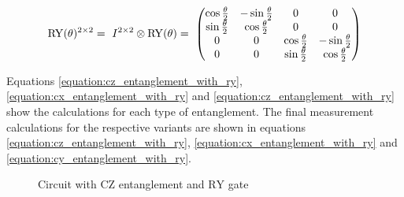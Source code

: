  \begin{equation}
     \centering
     \begin{split}
        \mathrm{RY}(\theta)^{2\times2} =\ I^{2\times2}\otimes\mathrm{RY}(\theta) =\  \begin{pmatrix}
        \cos{\frac{\theta}{2}} & -\sin{\frac{\theta}{2}} & 0 & 0\\
        \sin{\frac{\theta}{2}} & \cos{\frac{\theta}{2}} & 0 & 0 \\
        0 & 0 & \cos{\frac{\theta}{2}} & -\sin{\frac{\theta}{2}}\\
        0 & 0 & \sin{\frac{\theta}{2}} & \cos{\frac{\theta}{2}}\\
    \end{pmatrix}\\
     \end{split}
     \label{equation:2_x_2_ry}
 \end{equation}

Equations \ref{equation:cz_entanglement_with_ry}, \ref{equation:cx_entanglement_with_ry} and \ref{equation:cz_entanglement_with_ry} show the calculations for each type of entanglement. The final measurement calculations for the respective variants are shown in equations \ref{equation:cz_entanglement_with_ry}, \ref{equation:cx_entanglement_with_ry} and \ref{equation:cy_entanglement_with_ry}.

\begin{figure}[!ht]
    \centering
    \caption{Circuit with $\mathrm{CZ}$ entanglement and $\mathrm{RY}$ gate}
    \label{fig:circuit_cz_entangled_ry_gate}
\end{figure}

